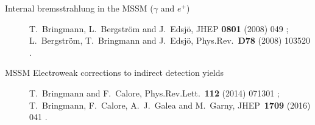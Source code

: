 \begin{description}
    \item[Internal bremsstrahlung in the MSSM ($\gamma$ and $e^+$)]
      T.~Bringmann, L.~Bergstr{\"o}m and J.~Edsj{\"o}, JHEP {\bfseries 0801} (2008) 049 \cite{Bringmann:2007nk};
       L.~Bergstr{\"o}m, T.~Bringmann and J.~Edsj{\"o}, Phys.Rev.\ {\bfseries D78} (2008) 103520 \cite{Bergstrom:2008gr}.
    \item[MSSM Electroweak corrections to indirect detection yields]
       T.~Bringmann and F.~Calore,  Phys.Rev.Lett.\ {\bfseries 112} (2014) 071301 \cite{Bringmann:2013oja};
       T.~Bringmann, F.~Calore, A.~J.~Galea and M.~Garny, JHEP\ {\bfseries 1709} (2016) 041 \cite{Bringmann:2017sko}.
  \end{description}
